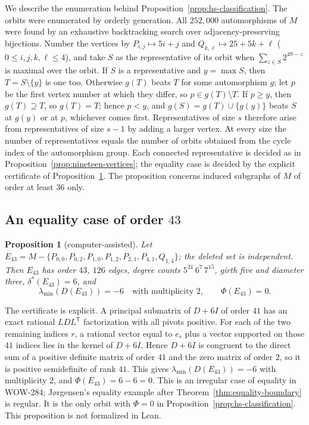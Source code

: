 \documentclass[a4paper,10pt,reqno]{amsart}
\theoremstyle{plain}
\newtheorem{proposition}[theorem]{Proposition}
\theoremstyle{definition}
\theoremstyle{remark}
\begin{document}
We describe the enumeration behind Proposition~\ref{prop:hs-classification}.
The orbits were enumerated by orderly generation. All \(252{,}000\)
automorphisms of \(M\) were found by an exhaustive backtracking search over
adjacency-preserving bijections. Number the vertices by
\(P_{i,j}\mapsto5i+j\) and \(Q_{k,\ell}\mapsto25+5k+\ell\)
(\(0\le i,j,k,\ell\le4\)), and take \(S\) as the representative of its orbit
when \(\sum_{z\in S}2^{49-z}\) is maximal over the orbit. If \(S\) is a
representative and \(y=\max S\), then \(T=S\setminus\{y\}\) is one too.
Otherwise \(g(T)\) beats \(T\) for some automorphism \(g\); let \(p\) be the
first vertex number at which they differ, so \(p\in g(T)\setminus T\). If
\(p\ge y\), then \(g(T)\supseteq T\), so \(g(T)=T\); hence \(p<y\), and
\(g(S)=g(T)\cup\{g(y)\}\) beats \(S\) at \(g(y)\) or at \(p\), whichever
comes first. Representatives of size \(s\) therefore arise from
representatives of size \(s-1\) by adding a larger vertex. At every size the
number of representatives equals the number of orbits obtained from the cycle
index of the automorphism group. Each connected representative is decided as
in Proposition~\ref{prop:nineteen-vertices}; the equality case is decided by
the explicit certificate of Proposition~\ref{prop:order43-equality}. The proposition
concerns induced subgraphs of \(M\) of order at least \(36\) only.

\subsection{An equality case of order \texorpdfstring{\(43\)}{43}}

\begin{proposition}[computer-assisted]\label{prop:order43-equality}
Let \(E_{43}=M-\{P_{0,0},P_{0,2},P_{1,0},P_{1,2},P_{2,1},P_{4,1},Q_{1,4}\}\);
the deleted set is independent. Then \(E_{43}\) has order \(43\), \(126\)
edges, degree counts \(5^{21}\,6^{7}\,7^{15}\), girth five and diameter three,
\(\delta^*(E_{43})=6\), and
\[
 \lambda_{\min}(D(E_{43}))=-6\quad\text{with multiplicity }2,
 \qquad \Phi(E_{43})=0.
\]
\end{proposition}

The certificate is explicit. A principal submatrix of \(D+6I\) of order
\(41\) has an exact rational \(LDL^{\mathsf T}\) factorization with all pivots
positive. For each of the two remaining indices \(r\), a rational vector equal
to \(e_r\) plus a vector supported on those \(41\) indices lies in the kernel
of \(D+6I\). Hence \(D+6I\) is congruent to the direct sum of a positive
definite matrix of order \(41\) and the zero matrix of order \(2\), so it is
positive semidefinite of rank \(41\). This gives
\(\lambda_{\min}(D(E_{43}))=-6\) with multiplicity \(2\), and
\(\Phi(E_{43})=6-6=0\). This is an irregular case of
equality in WOW-284; J{\o}rgensen's equality example after
Theorem~\ref{thm:equality-boundary} is regular. It is the only orbit with
\(\Phi=0\) in Proposition~\ref{prop:hs-classification}. This proposition is
not formalized in Lean.
\end{document}
